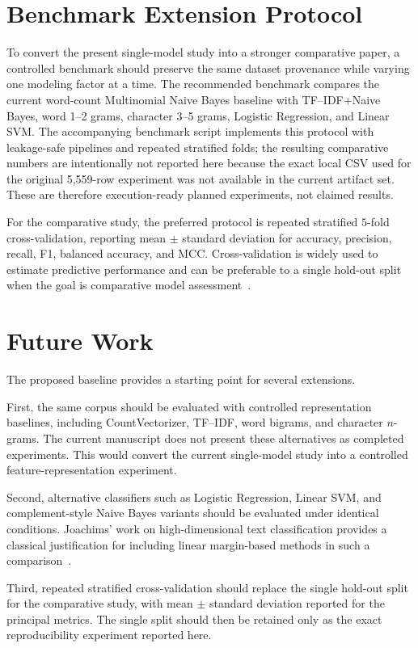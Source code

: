 \documentclass[conference]{IEEEtran}
\begin{document}
\section{Benchmark Extension Protocol}
To convert the present single-model study into a stronger comparative paper, a controlled benchmark should preserve the same dataset provenance while varying one modeling factor at a time. The recommended benchmark compares the current word-count Multinomial Naive Bayes baseline with TF--IDF+Naive Bayes, word 1--2 grams, character 3--5 grams, Logistic Regression, and Linear SVM. The accompanying benchmark script implements this protocol with leakage-safe pipelines and repeated stratified folds; the resulting comparative numbers are intentionally not reported here because the exact local CSV used for the original 5,559-row experiment was not available in the current artifact set. These are therefore execution-ready planned experiments, not claimed results.


For the comparative study, the preferred protocol is repeated stratified $5$-fold cross-validation, reporting mean $\pm$ standard deviation for accuracy, precision, recall, F1, balanced accuracy, and MCC. Cross-validation is widely used to estimate predictive performance and can be preferable to a single hold-out split when the goal is comparative model assessment~\cite{kohavi1995cv,varma2006cv}.

\section{Future Work}
The proposed baseline provides a starting point for several extensions.

First, the same corpus should be evaluated with controlled representation baselines, including CountVectorizer, TF--IDF, word bigrams, and character $n$-grams. The current manuscript does not present these alternatives as completed experiments. This would convert the current single-model study into a controlled feature-representation experiment.

Second, alternative classifiers such as Logistic Regression, Linear SVM, and complement-style Naive Bayes variants should be evaluated under identical conditions. Joachims' work on high-dimensional text classification provides a classical justification for including linear margin-based methods in such a comparison~\cite{joachims1998svm}.

Third, repeated stratified cross-validation should replace the single hold-out split for the comparative study, with mean $\pm$ standard deviation reported for the principal metrics. The single split should then be retained only as the exact reproducibility experiment reported here.
\end{document}
